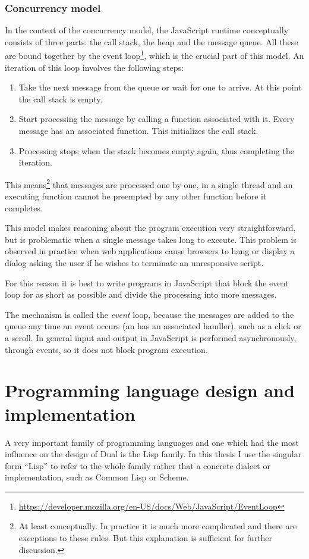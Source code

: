 \subsubsection{Concurrency model}
In the context of the concurrency model, the JavaScript runtime conceptually consists of three parts: the call stack, the heap and the message queue. All these are bound together by the event loop\footnote{\url{https://developer.mozilla.org/en-US/docs/Web/JavaScript/EventLoop}}, which is the crucial part of this model.
An iteration of this loop involves the following steps:
\begin{enumerate}
	\item Take the next message from the queue or wait for one to arrive. At this point the call stack is empty.
	\item Start processing the message by calling a function associated with it. Every message has an associated function. This initializes the call stack.
	\item Processing stops when the stack becomes empty again, thus completing the iteration.
\end{enumerate}

This means\footnote{At least conceptually. In practice it is much more complicated and there are exceptions to these rules. But this explanation is sufficient for further discussion.} that messages are processed one by one, in a single thread and an executing function cannot be preempted by any other function before it completes.

This model makes reasoning about the program execution very straightforward, but is problematic when a single message takes long to execute. This problem is observed in practice when web applications cause browsers to hang or display a dialog asking the user if he wishes to terminate an unresponsive script.

For this reason it is best to write programs in JavaScript that block the event loop for as short as possible and divide the processing into more messages.

The mechanism is called the \textit{event} loop, because the messages are added to the queue any time an event occurs (an has an associated handler), such as a click or a scroll. In general input and output in JavaScript is performed asynchronously, through events, so it does not block program execution.


\section{Programming language design and implementation}
A very important family of programming languages and one which had the most influence on the design of Dual is the Lisp family. In this thesis I use the singular form ``Lisp'' to refer to the whole family rather that a concrete dialect or implementation, such as Common Lisp or Scheme.

